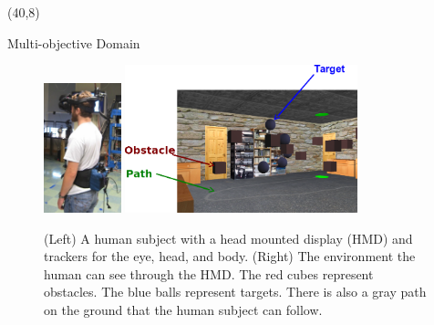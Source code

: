 \documentclass[final]{beamer}
\begin{document}
\begin{frame}{}
\begin{textblock}{37}(40,8)
\begin{block}{Multi-objective Domain}
\begin{figure}[h]
\centering
\includegraphics[width=0.2\textwidth]{human.jpg}
\includegraphics[width=0.6\textwidth]{env.png}
\caption{(Left) A human subject with a head mounted display (HMD) and trackers
for the eye, head, and body.  (Right) The environment the human can see through
the HMD.  The red cubes represent obstacles. The blue balls represent targets.
There is also a gray path on the ground that the human subject can follow.}
\label{fig:avatar}
\end{figure}
\end{block}


\end{textblock}
\end{frame}
\end{document}
